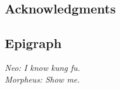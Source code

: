 \documentclass[
	12pt, 
	]{article}
\numberwithin{equation}{section}
\theoremstyle{definition}
\theoremstyle{plain}
\theoremstyle{plain}
\theoremstyle{plain}
\begin{document}
\thispagestyle{empty}


\subsection*{Acknowledgments}

\thispagestyle{empty}


\subsection*{Epigraph}



\begin{flushright}
	
\textit{Neo: I know kung fu. \\
		Morpheus: Show me.}
\end{flushright}


\thispagestyle{empty}

\newpage


{\onehalfspacing
	\begin{abstract}
		\vspace*{0.5cm}
		
		\lipsum[1]
		
\end{abstract}
}

\thispagestyle{empty}



{
	\onehalfspacing
	\begin{abstract}
		\vspace*{0.5cm}
		
		\lipsum[1]
		
\end{abstract}
}

\thispagestyle{empty}

\newpage
\end{document}

